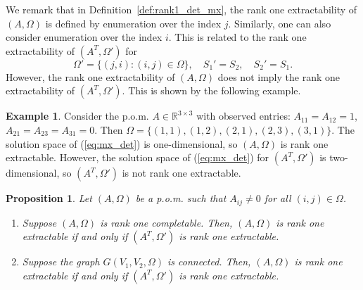 \documentclass{amsart}
\newcommand{\re}{\mathbb{R}}
\newcommand{\reff}[1]{(\ref{#1})}
\newcommand{\bnum}{\begin{enumerate}}
\newcommand{\enum}{\end{enumerate}}
\newcommand{\be}{\begin{equation}}
\newcommand{\ee}{\end{equation}}
\newtheorem{prop}[theorem]{Proposition}
\theoremstyle{definition}
\newtheorem{example}[theorem]{Example}
\numberwithin{equation}{section}
\begin{document}
We remark that in Definition~\ref{def:rank1_det_mx}, 
the rank one extractability of $(A, \Omega)$ is defined by enumeration over the index $j$.
Similarly, one can also consider enumeration over the index $i$.
This is related to the rank one extractability of $(A^T, \Omega')$ for 
\be\label{omg'}
\Omega' = \{ (j,i) : (i,j) \in \Omega \}, 
\quad S_1' = S_2, \quad S_2' = S_1.
\ee
However, the rank one extractability of $(A, \Omega)$ does not imply 
the rank one extractability of $(A^T, \Omega')$.
This is shown by the following example.



\begin{example}
Consider the p.o.m. $A \in \re^{3 \times 3}$ with observed entries:
$A_{11} =  A_{12} = 1$, $A_{21} = A_{23} = A_{31} = 0$.
Then $\Omega = \{(1,1), (1,2), (2,1), (2,3), (3,1)\}$.
The solution space of \reff{eq:mx_det} is one-dimensional, so 
$(A, \Omega)$ is rank one extractable.
However, the solution space of \reff{eq:mx_det} for $(A^T, \Omega')$ 
is two-dimensional, so $(A^T, \Omega')$ is not rank one extractable.
\end{example}









\begin{prop}\label{prop:extra_transpose}
Let $(A, \Omega)$ be a p.o.m. such that $A_{ij} \ne 0$ for all $(i,j) \in \Omega$. 
\bnum

\item[(i)] Suppose $(A, \Omega)$ is rank one completable.
Then, $(A , \Omega)$ is rank one extractable if and only if $(A^T, \Omega')$ is rank one extractable.

\item[(ii)] Suppose the graph $G(V_1, V_2, \Omega)$ is connected.
Then, $(A , \Omega)$ is rank one extractable if and only if $(A^T, \Omega')$ is rank one extractable.
\enum
\end{prop}
\end{document}

